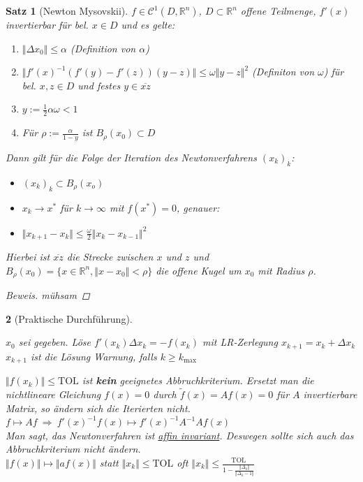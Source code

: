 \documentclass[12pt]{article}
\theoremstyle{break}
\newtheorem{theorem}{Satz}[subsection]
\newtheorem{nothing}[theorem]{}
\begin{document}
\begin{theorem}[Newton Mysovskii]
$f \in \mathcal{C}^1(D, \mathbb{R}^n)$, $D \subset \mathbb{R}^n$ offene Teilmenge, $f'(x)$ invertierbar für bel. $x \in D$ und es gelte:
\renewcommand{\labelenumi}{\roman{enumi})}
\begin{enumerate}
  \item $\Vert \Delta x_0 \Vert \leq \alpha$ (Definition von $\alpha$)
  \item $\Vert f'(x)^{-1} (f'(y) - f'(z)) (y-z) \Vert \leq \omega \Vert y-z \Vert ^2$ (Definiton von $\omega$) für bel. $x, z \in D$ und festes $y \in \overline{xz}$
  \item $y := \frac{1}{2} \alpha \omega < 1$
  \item Für $\rho := \frac{\alpha}{1-y}$ ist $B_{\rho}(x_0) \subset D$
\end{enumerate}
Dann gilt für die Folge der Iteration des Newtonverfahrens $(x_k)_k$:
\begin{itemize}
  \item $(x_k)_k \subset B_{\rho}(x_o)$
  \item $x_k \rightarrow x^*$ für $k \rightarrow \infty$ mit $f(x^*) = 0$, genauer:
  \item $\Vert x_{k+1} - x_k \Vert \leq \frac{\omega}{2} \Vert x_k - x_{k-1} \Vert^2$
\end{itemize}
Hierbei ist $\overline{xz}$ die Strecke zwischen $x$ und $z$ und 
$B_{\rho}(x_0) = \{x \in \mathbb{R}^n, \Vert x-x_0 \Vert < \rho \}$ die offene Kugel um $x_0$ mit Radius $\rho$.
\begin{proof}[Beweis] mühsam \end{proof}
\end{theorem}

\begin{nothing}[Praktische Durchführung]\leavevmode
\begin{algorithmic}
\STATE $x_0$ sei gegeben.
  \STATE Löse $f'(x_k) \Delta x_k = -f(x_k)$ mit LR-Zerlegung
  \STATE $x_{k+1} = x_k + \Delta x_k$
    \STATE $x_{k+1}$ ist die Lösung
    \STATE Warnung, falls $k \geq k_{\max}$
  \ENDIF
\ENDFOR
\end{algorithmic}
$\Vert f(x_k) \Vert \leq \text{TOL}$ ist \textbf{kein} geeignetes Abbruchkriterium. Ersetzt man die nichtlineare Gleichung $f(x) = 0$ durch $\tilde{f}(x) = Af(x) = 0$ für $A$ invertierbare Matrix, so ändern sich die Iterierten nicht. \\
$f \mapsto Af \medspace \Rightarrow \medspace f'(x)^{-1}f(x) \mapsto f'(x)^{-1}A^{-1}Af(x)$ \\
Man sagt, das Newtonverfahren ist \underline{affin invariant}. Deswegen sollte sich auch das Abbruchkriterium nicht ändern. \\
$\Vert f(x) \Vert \mapsto \Vert af(x) \Vert$ statt $\Vert x_k \Vert \leq \text{TOL}$ oft $\Vert x_k \Vert \leq \frac{\text{TOL}}{1- \frac{\Vert \Delta_k \Vert}{\Vert \Delta_k - 1 \Vert}}$
\end{nothing}
\end{document}
